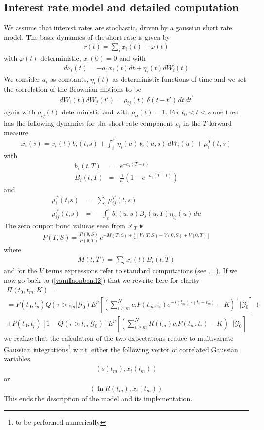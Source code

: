 \documentclass[a4paper,10pt]{report}
\theoremstyle{plain}
\theoremstyle{definition}
\newcommand\be{\begin{eqnarray}}    %
\newcommand\ee{\end{eqnarray}}
\newcommand{\FF} {\mathcal{F} }
\newcommand{\GG} {\mathcal{G} }
\begin{document}
\subsection{Interest rate model and detailed computation}
We assume that interest rates are stochastic, driven by a gaussian short rate model.
The basic dynamics of the short rate is given by
\be
r\left(t\right)=\sum_i x_{i}\left(t\right)+\varphi\left(t\right)
\ee
with $\varphi\left(t\right)$ deterministic, $x_{i}\left(0\right)=0$
and with
\be
dx_{i}\left(t\right)=-a_{i}\, x_{i}\left(t\right)dt+\eta_{i}\left(t\right)dW_{i}\left(t\right)
\ee
We consider $a_{i}$ as constants, $\eta_{i}\left(t\right)$ as deterministic
functions of time and we set the correlation of the Brownian motions
to be
\be
dW_{i}\left(t\right)dW_{j}\left(t'\right)=\rho_{ij}\left(t\right)\,\delta\left(t-t'\right)\, dt\, dt^{\prime}
\ee
again with $\rho_{ij}\left(t\right)$ deterministic and with $\rho_{ii}\left(t\right)=1$.
For $t_0<t<s$ one then has the following dynamics for the short rate component $x_i$ in the $T$-forward measure
\be
x_{i}\left(s\right)=x_{i}\left(t\right)\, b_{i}\left(t,s\right)+\int_{t}^{s}\,\eta_{i}\left(u\right)\, b_{i}\left(u,s\right)\, dW_{i}\left(u\right)+\mu_{i}^{T}\left(t,s\right)
\ee
with 
\be
b_{i}\left(t,T\right) & = & e^{-a_{i}\left(T-t\right)}\\
B_{i}\left(t,T\right) & = & \frac{1}{a_{i}}\left(1-e^{-a_{i}\left(T-t\right)}\right)
\ee
and
\be
\mu_{i}^{T}\left(t,s\right) & = & \sum_{j}\mu_{ij}^{T}\left(t,s\right)\\
\mu_{ij}^{T}\left(t,s\right) & = & -\int_{t}^{s}\, b_{i}\left(u,s\right)B_{j}\left(u,T\right)\eta_{ij}\left(u\right)\, du 
\ee
The zero coupon bond valueas seen from $\FF_T$ is 
\be 
P\left(T,S\right)=\frac{P\left(0,S\right)}{P\left(0,T\right)}\, e^{-M\left(T,S\right)+\frac{1}{2}\left[V\left(T,S\right)-V\left(0,S\right)+V\left(0,T\right)\right]}
\ee
where 
\be 
M\left(t,T\right) = \sum_i x_{i}\left(t\right)B_{i}\left(t,T\right)
\ee
and for the $V$ terms expressions refer to standard computations (see ....).
If we now go back to (\ref{vanillaonbond2}) that we rewrite here for clarity
\be
\label{vanillaonbond5}
\Pi\left(t_0, t_m, K \right)=\\
=P(t_0, t_p)Q\left(\tau>t_m | \GG_0\right) E^p\left[\left( \sum_{i\ge m}^N c_i P(t_m, t_i) e^{-s(t_m)\cdot (t_i-t_m)} - K \right)^+ | \GG_0 \right]+\\
+P(t_0, t_p)\left[1-Q\left(\tau>t_m | \GG_0\right)\right]E^p\left[ \left(\sum_{i\ge m}^N R(t_m) c_i P(t_m, t_i)  - K \right)^+ | \GG_0 \right]
\ee
we realize that the calculation of the two expectations reduce to multivariate Gaussian integrations\footnote{to be performed numerically} w.r.t. either the following vector of correlated Gaussian variables
\be 
\left( s(t_m), x_{i}\left(t_m\right) \right)
\ee
or 
\be 
\left( \ln R(t_m), x_{i}\left(t_m\right) \right)
\ee
This ends the description of the model and its implementation.
\end{document}
